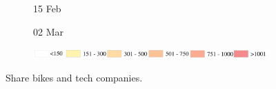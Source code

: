 \documentclass[ijgi,submit,moreauthors,pdftex]{Definitions/mdpi}
\begin{document}
\begin{figure}[H]
\begin{subfigure}{.3\textwidth}
        \caption{15 Feb}
    \end{subfigure}
    \begin{subfigure}{.3\textwidth}
        \caption{02 Mar}
    \end{subfigure}

    \vspace{6pt}
    \begin{subfigure}{.7\textwidth}
        \includegraphics[width=\textwidth]{Figures/AppendixLegend2-eps-converted-to.pdf}
    \end{subfigure}
    \caption{Share bikes and tech companies.}
    \label{fig:BSS_companies}
\end{figure}
\end{document}

